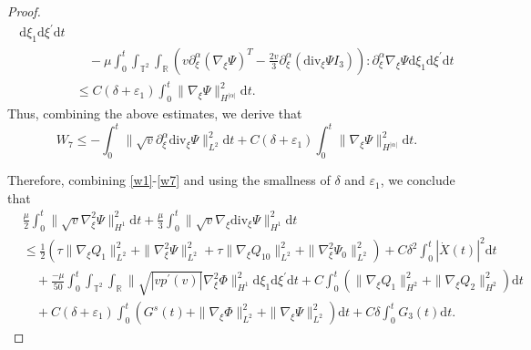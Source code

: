 \documentclass[10pt,a4paper]{amsart}
\newcommand{\ddiv}{\mathrm{div}}
\newcommand{\dif}{\mathrm{d}}
\begin{document}
\begin{proof}
\begin{align*}
		\dif \xi_1\dif \xi^{\prime}\dif t\\
		&\quad-\mu\int_0^t\int_{\mathbb{T}^2}\int_{\mathbb{R}}
		\left(v\partial_\xi^\alpha\left(\nabla_\xi\Psi\right)^T
		-\frac{2v}{3}\partial_\xi^\alpha\left(\ddiv_\xi\Psi I_3\right)\right):\partial_\xi^\alpha\nabla_\xi\Psi
		\dif \xi_1\dif \xi^{\prime}\dif t\\
		&\le
		C(\delta+\varepsilon_1)
		\int_0^t \|\nabla_\xi\Psi\|^2_{H^{|\alpha|}}
		\dif t.
	\end{align*}
Thus, combining the above estimates, we derive that
\begin{equation}\label{w7}
W_7\le -\int_0^t
\|\sqrt{v} \partial_\xi^\alpha\ddiv_\xi\Psi\|_{L^2}^2
\dif t+C(\delta+\varepsilon_1)
\int_0^t \|\nabla_\xi\Psi\|^2_{H^{|\alpha|}}
\dif t.
\end{equation}

Therefore, combining \eqref{w1}-\eqref{w7} and using the smallness of $\delta$ and $\varepsilon_1$, we conclude that
\begin{equation}\label{gjhsgj4}
\begin{aligned}
&\frac{\mu}{2}\int_0^t\|\sqrt{v}\nabla^2_\xi\Psi\|_{H^1}^2\dif t
+\frac{\mu}{3}\int_0^t\|
\sqrt{v}\nabla_\xi\ddiv_\xi\Psi\|_{H^1}^2
\dif t\\
&\le
\frac{1}{2}\left(\tau\|\nabla_\xi Q_{1}\|_{L^2}^2+\|\nabla^2_\xi\Psi\|_{L^2}^2
+\tau\|\nabla_\xi Q_{10}\|_{L^2}^2+\|\nabla^2_\xi\Psi_0\|_{L^2}^2\right)
+C\delta^2\int_0^t|\dot X(t)|^2\dif t\\
&\quad
+\frac{-\mu}{50}\int_0^t\int_{\mathbb{T}^2}\int_{\mathbb{R}}\|\sqrt{|vp^\prime(v)|}\nabla^2_\xi\Phi\|_{H^1}^2\dif \xi_1\dif \xi^{\prime}\dif t
+C\int_0^t\left(\|\nabla_\xi Q_1\|_{H^{2}}^2+\|\nabla_\xi Q_2\|_{H^{2}}^2\right)\dif t\\
&\quad+C(\delta+\varepsilon_1)\int_0^t\left(G^s(t)+\|\nabla_\xi \Phi\|_{L^2}^2+\|\nabla_\xi \Psi\|_{L^2}^2\right)\dif t
+C\delta\int_0^tG_3(t)\dif t.
\end{aligned}
\end{equation}


\end{proof}
\end{document}
